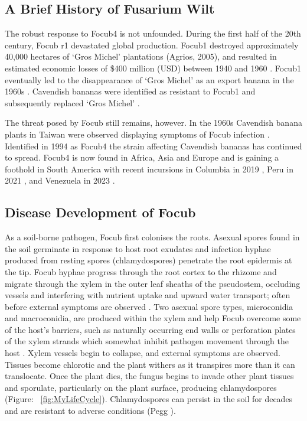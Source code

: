 \subsection{A Brief History of Fusarium Wilt}

The robust response to \ac{Focub4} is not unfounded. During the first half of the 20th century, \acs{Focub} \ac{r1} devastated global production. \acs{Focub1} destroyed approximately 40,000 hectares of ‘Gros Michel’ plantations (Agrios, 2005), and resulted in estimated economic losses of \$400 million (USD) between 1940 and 1960 \parencite{Ploetz2005}. \ac{Focub1} eventually led to the disappearance of ‘Gros Michel’ as an export banana in the 1960s \parencite{Molina2007}. Cavendish bananas were identified as resistant to \ac{Focub1} and subsequently replaced ‘Gros Michel’ \parencite{Ordonez2015}. 

The threat posed by \ac{Focub} still remains, however. In the 1960s Cavendish banana plants in Taiwan were observed displaying symptoms of \ac{Focub} infection \parencite{Agrios2005}. Identified in 1994 as \acl{Focub4} \parencite{Ploetz1994} the strain affecting Cavendish bananas has continued to spread. \Ac{Focub4} is now found in Africa, Asia and Europe \parencite{Ploetz2015a, Thangavelu2019} and is gaining a foothold in South America with recent incursions in Columbia in 2019 \parencite{Garcia-Bastidas2019}, Peru in 2021 \parencite{Acuna2022}, and Venezuela in 2023 \parencite{Herrera2023}.

\subsection{Disease Development of \acl{Focub}}

As a soil-borne pathogen, \ac{Focub} first colonises the roots. Asexual spores found in the soil germinate in response to host root exudates and infection hyphae produced from resting spores (chlamydospores) penetrate the root epidermis at the tip. \ac{Focub} hyphae progress through the root cortex to the rhizome and migrate through the xylem in the outer leaf sheaths of the pseudostem, occluding vessels and interfering with nutrient uptake and upward water transport; often before external symptoms are observed \parencite{Li2017, Warman2018}. Two asexual spore types, microconidia and macroconidia, are produced within the xylem and help \ac{Focub} overcome some of the host’s barriers, such as naturally occurring end walls or perforation plates of the xylem strands which somewhat inhibit pathogen movement through the host \parencite{Dita2018}. Xylem vessels begin to collapse, and external symptoms are observed. Tissues become chlorotic and the plant withers as it transpires more than it can translocate. Once the plant dies, the fungus begins to invade other plant tissues and sporulate, particularly on the plant surface, producing chlamydospores (Figure: ~\ref{fig:MyLifeCycle}). Chlamydospores can persist in the soil for decades and are resistant to adverse conditions (Pegg ).  

